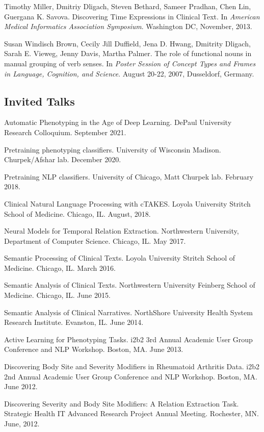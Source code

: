\documentclass[letterpaper]{article}
\renewenvironment{itemize}{
  \begin{list}{}{
    \setlength{\leftmargin}{1.5em}
  }
}{
  \end{list}
}
\begin{document}
\begin{itemize}
\item Timothy Miller, Dmitriy Dligach, Steven Bethard, Sameer Pradhan, Chen Lin, Guergana K. Savova. Discovering Time Expressions in Clinical Text. In \emph{American Medical Informatics Association Symposium}. Washington DC, November, 2013.
\item Susan Windisch Brown, Cecily Jill Duffield, Jena D. Hwang, Dmitrity Dligach, Sarah E. Vieweg, Jenny Davis, Martha Palmer. The role of functional nouns in manual grouping of verb senses. In \emph {Poster Session of Concept Types and Frames in Language, Cognition, and Science}. August 20-22, 2007, Dusseldorf, Germany.
\end{itemize}

\subsection*{Invited Talks}
\begin{itemize}
\item Automatic Phenotyping in the Age of Deep Learning. DePaul University Research Colloquium. September 2021.
\item Pretraining phenotyping classifiers. University of Wisconsin Madison. Churpek/Afshar lab. December 2020.
\item Pretraining NLP classifiers. University of Chicago, Matt Churpek lab. February 2018.
\item Clinical Natural Language Processing with cTAKES. Loyola University Stritch School of Medicine. Chicago, IL. August, 2018.
\item Neural Models for Temporal Relation Extraction. Northwestern University, Department of Computer Science. Chicago, IL. May 2017.
\item Semantic Processing of Clinical Texts. Loyola University Stritch School of Medicine. Chicago, IL. March 2016.
\item Semantic Analysis of Clinical Texts. Northwestern University Feinberg School of Medicine. Chicago, IL. June 2015.
\item Semantic Analysis of Clinical Narratives. NorthShore University Health System Research Institute. Evanston, IL. June 2014.
\item Active Learning for Phenotyping Tasks. i2b2 3rd Annual Academic User Group Conference and NLP Workshop. Boston, MA. June 2013.
\item Discovering Body Site and Severity Modifiers in Rheumatoid Arthritis Data. i2b2 2nd Annual Academic User Group Conference and NLP Workshop. Boston, MA. June 2012.
\item Discovering Severity and Body Site Modifiers: A Relation Extraction Task. Strategic Health IT Advanced Research Project Annual Meeting. Rochester, MN. June, 2012.
\end{itemize}
\end{document}
